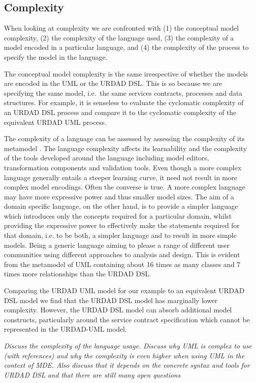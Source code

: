 
\subsection{Complexity}

When looking at complexity we are confronted with (1) the conceptual model complexity, (2) the complexity of the language used, (3) the complexity of a model encoded in a particular language, and (4) the complexity of the process to specify the model in the language. 

The conceptual model complexity is the same irrespective of whether the models are encoded in the UML or the URDAD DSL. This is so because we are specifying the same model, i.e.\ the same services contracts, processes and data structures. For example, it is senseless to evaluate the cyclomatic complexity \cite{mccabe_complexity_1976} of an URDAD DSL process and compare it to the cyclomatic complexity of the equivalent URDAD UML process.

The complexity of a language can be assessed by assessing the complexity of its metamodel \cite{mohagheghi_evaluating_2007}. The language complexity affects its learnability and the complexity of the tools developed around the language including model editors, transformation components and validation tools. Even though a more complex language generally entails a steeper learning curve, it need not result in more complex model encodings. Often the converse is true. A more complex language may have more expressive power and thus smaller model sizes. The aim of a domain specific language, on the other hand, is to provide a simpler language which introduces only the concepts required for a particular domain, whilst providing the expressive power to effectively make the statements required for that domain, i.e. to be both, a simpler language and to result in more simple models. Being a generic language aiming to please a range of different user communities using different approaches to analysis and design. This is evident from the metamodel of UML containing about 16 times as many classes and 7 times more relationships than the URDAD DSL.

Comparing the URDAD UML model for our example to an equivalent URDAD DSL model we find that the URDAD DSL model has marginally lower complexity. However, the URDAD DSL model can absorb additional model constructs, particularly around the service contract specification which cannot be represented in the URDAD-UML model.

\emph{Discuss the complexity of the language usage. Discuss why UML is complex to use (with references) and why the complexity is even higher when using UML in the context of MDE. Also discuss that it depends on the concrete syntax and tools for URDAD DSL and that there are still many open questions}
